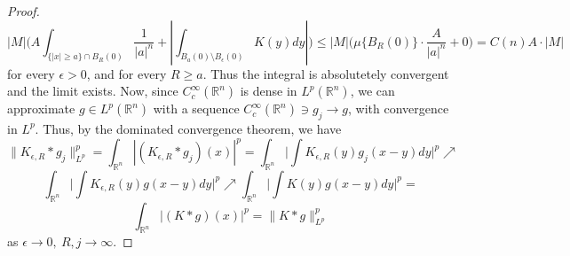 \documentclass[12pt]{article}
\newenvironment{exercise}[2][Exercise]{\begin{trivlist}
\item[\hskip \labelsep {\bfseries #1}\hskip \labelsep {\bfseries #2.}]}{\end{trivlist}}
\begin{document}
\begin{proof}
$$|M| \Big(A \int_{\{|x| \ge a\} \cap B_R(0)} \dfrac{1}{|a|^n} + |\int_{B_{a}(0) \setminus B_\epsilon(0)} K(y) dy| \Big) \le |M| \Big(\mu\{B_R(0)\} \cdot \dfrac{A}{|a|^n} + 0 \Big) = C(n)A \cdot |M|$$
for every $\epsilon > 0$, and for every $R \ge a$. Thus the integral is absolutetely convergent and the limit exists. Now, since $C_c^\infty(\mathbb{R}^n)$ is dense in $L^p(\mathbb{R}^n)$, we can approximate $g \in L^p(\mathbb{R}^n)$ with a sequence $C_c^\infty(\mathbb{R}^n) \ni g_j \rightarrow g$, with convergence in $L^p$. Thus, by the dominated convergence theorem, we have
$$\|K_{\epsilon, R} * g_j\|_{L^p}^p = \int_{\mathbb{R}^n} |(K_{\epsilon, R} * g_j)(x)|^p = \int_{\mathbb{R}^n} \Big| \int K_{\epsilon, R}(y) g_j(x-y) dy \Big|^p \nearrow$$
$$\int_{\mathbb{R}^n} \Big| \int K_{\epsilon, R}(y) g(x-y) dy \Big|^p \nearrow \int_{\mathbb{R}^n} \Big| \int K(y) g(x-y) dy \Big|^p =$$
$$\int_{\mathbb{R}^n} |(K * g)(x)|^p = \|K * g\|_{L^p}^p$$
as $\epsilon \rightarrow 0,\ R, j \rightarrow \infty$.
\end{proof}

\begin{exercise}{4}
\end{exercise}
\end{document}
